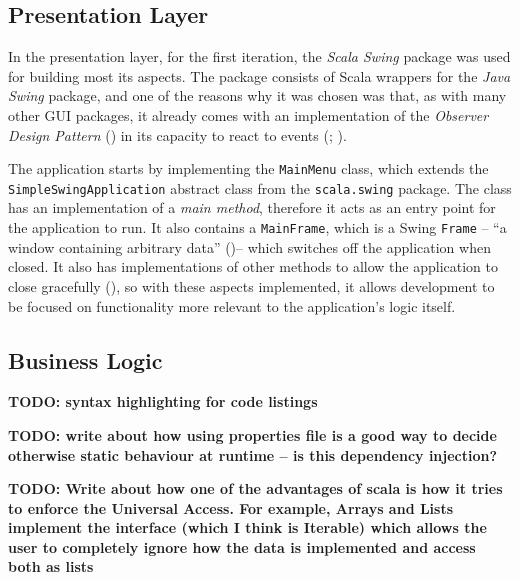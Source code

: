 \subsection{Presentation Layer} \label{sec:Implementation.Presentation}
In the presentation layer, for the first iteration, the \emph{Scala Swing}
package was used for building most its aspects. The package consists of Scala
wrappers for the \emph{Java Swing} package, and one of the reasons why it was
chosen was that, as with many other GUI packages, it already comes with an
implementation of the \emph{Observer Design Pattern}
(\cite[][p.~293]{gamma1995design}) in its capacity to react to events
(\cite[][p.~5]{maier2009scala};
\cite[][Ch.~9,~Location~3731]{nikolov2016scala}).

\begin{sloppypar}
  The application starts by implementing the \texttt{MainMenu} class, which
  extends the \texttt{SimpleSwingApplication} abstract class from the
  \texttt{scala.swing} package. The class has an implementation of a \emph{main
  method}, therefore it acts as an entry point for the application to run. It
  also contains a \texttt{MainFrame}, which is a Swing \texttt{Frame} -- ``a
  window containing arbitrary data''
  (\cite[][Ch.~34,~Section~34.1]{odersky2016scala})-- which switches off the
  application when closed. It also has implementations of other methods to
  allow the application to close gracefully
  (\cite[][p.~2~\&~3]{maier2009scala}), so with these aspects implemented, it
  allows development to be focused on functionality more relevant to the
  application's logic itself.
\end{sloppypar}


\subsection{Business Logic} \label{sec:Implementation.BusinessLogic}

\textbf{TODO: syntax highlighting for code listings}

\textbf{TODO: write about how using properties file is a good way to decide
otherwise static behaviour at runtime -- is this dependency injection?}

\textbf{TODO: Write about how one of the advantages of scala is how it tries to
enforce the Universal Access. For example, Arrays and Lists implement the
interface (which I think is Iterable) which allows the user to completely
ignore how the data is implemented and access both as lists}

